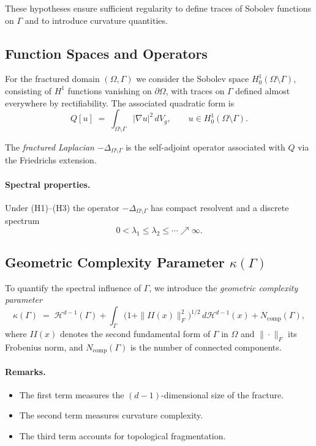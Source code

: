 These hypotheses ensure sufficient regularity to define traces of Sobolev
functions on $\Gamma$ and to introduce curvature quantities.

\subsection{Function Spaces and Operators}

For the fractured domain $(\Omega,\Gamma)$ we consider the Sobolev space
$H^1_0(\Omega\setminus\Gamma)$, consisting of $H^1$ functions vanishing on
$\partial\Omega$, with traces on $\Gamma$ defined almost everywhere by
rectifiability. The associated quadratic form is
\[
Q[u] \;=\; \int_{\Omega\setminus\Gamma} |\nabla u|^2 \, dV_g,
\qquad u \in H^1_0(\Omega\setminus\Gamma).
\]

\begin{definition}
The \emph{fractured Laplacian} $-\Delta_{\Omega\setminus\Gamma}$ is the
self-adjoint operator associated with $Q$ via the Friedrichs extension.
\end{definition}

\paragraph{Spectral properties.}
Under (H1)--(H3) the operator $-\Delta_{\Omega\setminus\Gamma}$ has compact
resolvent and a discrete spectrum
\[
0 < \lambda_1 \leq \lambda_2 \leq \cdots \nearrow \infty.
\]

\subsection{Geometric Complexity Parameter $\kappa(\Gamma)$}

To quantify the spectral influence of $\Gamma$, we introduce the
\emph{geometric complexity parameter}
\[
\kappa(\Gamma) \;=\;
\mathcal{H}^{d-1}(\Gamma)
+ \int_\Gamma \bigl(1+\|II(x)\|_F^2\bigr)^{1/2}\,
  d\mathcal{H}^{d-1}(x)
+ N_{\mathrm{comp}}(\Gamma),
\]
where $II(x)$ denotes the second fundamental form of $\Gamma$ in $\Omega$
and $\|\cdot\|_F$ its Frobenius norm, and $N_{\mathrm{comp}}(\Gamma)$
is the number of connected components.

\paragraph{Remarks.}
\begin{itemize}
  \item The first term measures the $(d-1)$-dimensional size of the fracture.
  \item The second term measures curvature complexity.
  \item The third term accounts for topological fragmentation.
\end{itemize}

